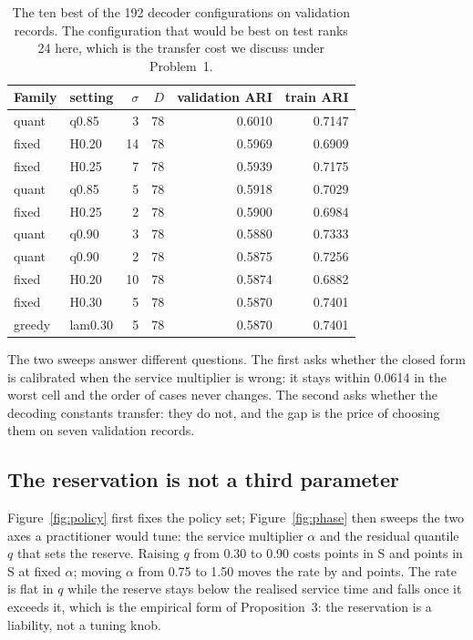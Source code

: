\begin{table}[H]
\centering
\scriptsize
\setlength{\tabcolsep}{4pt}
\begin{tabular}{@{}llrrrr@{}}
\hline
Family & setting & $\sigma$ & $D$ & validation ARI & train ARI \\
\hline
quant & q0.85 & 3 & 78 & 0.6010 & 0.7147 \\
fixed & H0.20 & 14 & 78 & 0.5969 & 0.6909 \\
fixed & H0.25 & 7 & 78 & 0.5939 & 0.7175 \\
quant & q0.85 & 5 & 78 & 0.5918 & 0.7029 \\
fixed & H0.25 & 2 & 78 & 0.5900 & 0.6984 \\
quant & q0.90 & 3 & 78 & 0.5880 & 0.7333 \\
quant & q0.90 & 2 & 78 & 0.5875 & 0.7256 \\
fixed & H0.20 & 10 & 78 & 0.5874 & 0.6882 \\
fixed & H0.30 & 5 & 78 & 0.5870 & 0.7401 \\
greedy & lam0.30 & 5 & 78 & 0.5870 & 0.7401 \\
\hline
\end{tabular}
\caption{The ten best of the 192 decoder configurations on validation records. The
configuration that would be best on test ranks 24 here, which is the transfer cost we discuss under Problem~1.}
\label{tab:decoder-sweep}
\end{table}

The two sweeps answer different questions. The first asks whether the closed form is
calibrated when the service multiplier is wrong: it stays within 0.0614 in the worst cell and the order of cases
never changes. The second asks whether the decoding constants transfer: they do not,
and the gap is the price of choosing them on seven validation records.


\subsection*{The reservation is not a third parameter}

Figure~\ref{fig:policy} first fixes the policy set; Figure~\ref{fig:phase} then sweeps the two axes a practitioner would tune: the service
multiplier $\alpha$ and the residual quantile $q$ that sets the reserve. Raising $q$
from 0.30 to 0.90 costs \slotPPhaseDropSTwo{} points in S\slotCaseTwo{} and
\slotPPhaseDropSThree{} points in S\slotCaseThree{} at fixed $\alpha$; moving $\alpha$
from 0.75 to 1.50 moves the rate by \slotPPhaseAlphaSpreadSTwo{} and
\slotPPhaseAlphaSpreadSThree{} points. The rate is flat in $q$ while the reserve stays
below the realised service time and falls once it exceeds it, which is the empirical
form of Proposition~3: the reservation is a liability, not a tuning knob.

